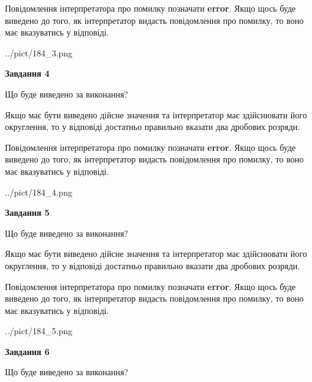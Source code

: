 \documentclass[12pt, ukrainian]{article}
\begin{document}
{\begin {Large}
Повідомлення інтерпретатора про помилку позначати \textbf{error}.
Якщо щось буде виведено до того, як інтерпретатор видасть повідомлення про помилку, 
то воно має вказуватись у відповіді. \par

\begin{center}
	{../pict/184_3.png}
\end{center}
\newpage

{\begin {center}\textbf{Завдання 4}\end {center}}\par
Що буде виведено за виконання? \par

Якщо має бути виведено дійсне значення та інтерпретатор має здійснювати його округлення, 
то у відповіді достатньо правильно вказати два дробових розряди.

Повідомлення інтерпретатора про помилку позначати \textbf{error}.
Якщо щось буде виведено до того, як інтерпретатор видасть повідомлення про помилку, 
то воно має вказуватись у відповіді. \par

\begin{center}
	{../pict/184_4.png}
\end{center}
\newpage

{\begin {center}\textbf{Завдання 5}\end {center}}\par
Що буде виведено за виконання? \par

Якщо має бути виведено дійсне значення та інтерпретатор має здійснювати його округлення, 
то у відповіді достатньо правильно вказати два дробових розряди.

Повідомлення інтерпретатора про помилку позначати \textbf{error}.
Якщо щось буде виведено до того, як інтерпретатор видасть повідомлення про помилку, 
то воно має вказуватись у відповіді. \par

\begin{center}
	{../pict/184_5.png}
\end{center}
\newpage

{\begin {center}\textbf{Завдання 6}\end {center}}\par
Що буде виведено за виконання? \par


\end{Large}}
\end{document}
